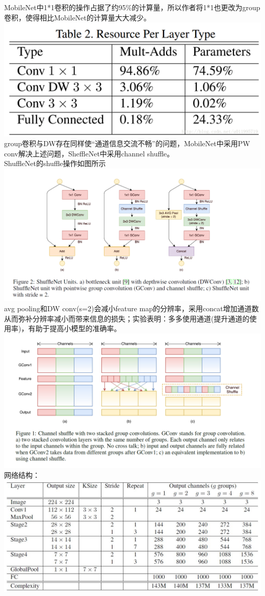 MobileNet中1*1卷积的操作占据了约95\%的计算量，所以作者将1*1也更改为group卷积，使得相比MobileNet的计算量大大减少。
\includegraphics{./img/ch17/22.png}
group卷积与DW存在同样使``通道信息交流不畅''的问题，MobileNet中采用PW
conv解决上述问题，SheffleNet中采用channel shuffle。\\
ShuffleNet的shuffle操作如图所示 \includegraphics{./img/ch17/24.png} avg
pooling和DW conv(s=2)会减小feature
map的分辨率，采用concat增加通道数从而弥补分辨率减小而带来信息的损失；实验表明：多多使用通道(提升通道的使用率)，有助于提高小模型的准确率。
\includegraphics{./img/ch17/23.png} 网络结构：\\
\includegraphics{./img/ch17/25.png}

